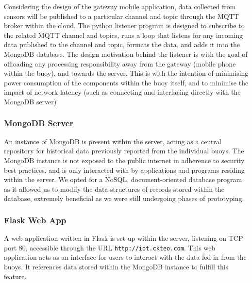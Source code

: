 \documentclass{article}
\begin{document}
\begin{multicols}{2}

Considering the design of the gateway mobile application, data collected from sensors will be published to a particular channel and topic through the MQTT broker within the cloud. The python listener program is designed to subscribe to the related MQTT channel and topics, runs a loop that listens for any incoming data published to the channel and topic, formats the data, and adds it into the MongoDB database. The design motivation behind the listener is with the goal of offloading any processing responsibility away from the gateway (mobile phone within the buoy), and towards the server. This is with the intention of minimising power consumption of the components within the buoy itself, and to minimise the impact of network latency (such as connecting and interfacing directly with the MongoDB server)

\end{multicols}

\subsubsection{MongoDB Server}

\begin{multicols}{2}

An instance of MongoDB is present within the server, acting as a central repository for historical data previously reported from the individual buoys. The MongoDB instance is not exposed to the public internet in adherence to security best practices, and is only interacted with by applications and programs residing within the server. We opted for a NoSQL, document-oriented database program as it allowed us to modify the data structures of records stored within the database, extremely beneficial as we were still undergoing phases of prototyping.

\end{multicols}

\subsubsection{Flask Web App}

\begin{multicols}{2}

A web application written in Flask is set up within the server, listening on TCP port 80, accessible through the URL \texttt{http://iot.ckteo.com}. This web application acts as an interface for users to interact with the data fed in from the buoys. It references data stored within the MongoDB instance to fulfill this feature.

\end{multicols}
\end{document}
